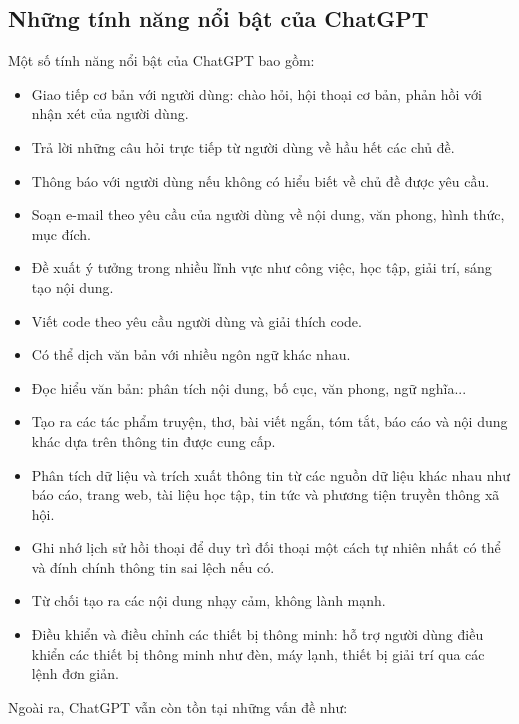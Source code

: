 \documentclass[a4paper, 12pt]{article}
\begin{document}
		\subsection{Những tính năng nổi bật của ChatGPT}
		Một số tính năng nổi bật của ChatGPT bao gồm:
		\begin{itemize}
			\item Giao tiếp cơ bản với người dùng: chào hỏi, hội thoại cơ bản, phản hồi với nhận xét của người dùng.
			\item Trả lời những câu hỏi trực tiếp từ người dùng về hầu hết các chủ đề.
			\item Thông báo với người dùng nếu không có hiểu biết về chủ đề được yêu cầu.
			\item Soạn e-mail theo yêu cầu của người dùng về nội dung, văn phong, hình thức, mục đích.
			\item Đề xuất ý tưởng trong nhiều lĩnh vực như công việc, học tập, giải trí, sáng tạo nội dung.
			\item Viết code theo yêu cầu người dùng và giải thích code.
			\item Có thể dịch văn bản với nhiều ngôn ngữ khác nhau.
			\item Đọc hiểu văn bản: phân tích nội dung, bố cục, văn phong, ngữ nghĩa...
			\item Tạo ra các tác phẩm truyện, thơ, bài viết ngắn, tóm tắt, báo cáo và nội dung khác dựa trên thông tin được cung cấp.
			\item Phân tích dữ liệu và trích xuất thông tin từ các nguồn dữ liệu khác nhau như báo cáo, trang web, tài liệu học tập, tin tức và phương tiện truyền thông xã hội.
			\item Ghi nhớ lịch sử hồi thoại để duy trì đối thoại một cách tự nhiên  nhất có thể và đính chính thông tin sai lệch nếu có.
			\item Từ chối tạo ra các nội dung nhạy cảm, không lành mạnh.
			\item Điều khiển và điều chỉnh các thiết bị thông minh: hỗ trợ người dùng điều khiển các thiết bị thông minh như đèn, máy lạnh, thiết bị giải trí qua các lệnh đơn giản.
		\end{itemize}
		Ngoài ra, ChatGPT vẫn còn tồn tại những vấn đề như:
\end{document}
